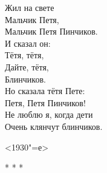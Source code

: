 \begin{center}
\begin{minipage}{0.4\textwidth}
\raggedright
Жил на свете \\
Мальчик Петя, \\
Мальчик Петя Пинчиков. \\
И сказал он: \\
Тётя, тётя, \\
Дайте, тётя, \\
Блинчиков.\\

\vspace{0.5cm}
Но сказала тётя Пете: \\
Петя, Петя Пинчиков! \\
Не люблю я, когда дети \\
Очень клянчут блинчиков.\\

\vspace{0.2cm}
\begin{flushright}
   <1930"=е>
\end{flushright}
\end{minipage}
\end{center}

\begin{center}
* * *    
\end{center}